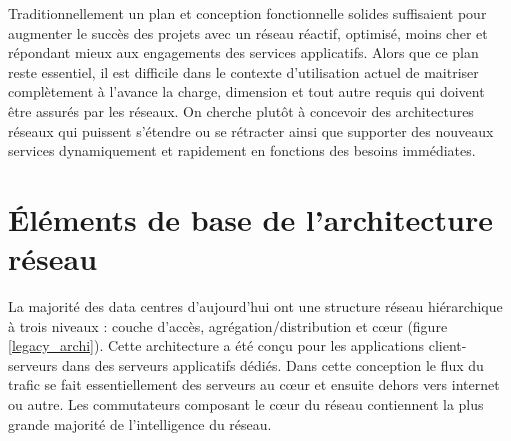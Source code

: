 Traditionnellement un plan et conception fonctionnelle solides suffisaient pour augmenter le succès des projets avec un réseau réactif, optimisé, moins cher et répondant mieux aux engagements des services applicatifs. Alors que ce plan reste essentiel, il est difficile dans le contexte d'utilisation actuel de maitriser complètement  à l'avance la charge, dimension et tout autre requis qui doivent être assurés par les réseaux. On cherche plutôt à concevoir des architectures réseaux qui puissent s'étendre ou se rétracter ainsi que supporter des nouveaux services dynamiquement et rapidement  en fonctions des besoins immédiates. \cite{ibmPlanningVirtCCchap4}


\section{Éléments de base de l'architecture réseau}

La majorité des data centres d'aujourd'hui ont une structure réseau hiérarchique à trois niveaux : couche d'accès, agrégation/distribution et cœur (figure \ref{legacy_archi}). Cette architecture a été conçu pour les applications client-serveurs dans des serveurs applicatifs dédiés. Dans cette conception le flux du trafic se fait essentiellement des serveurs au cœur et ensuite dehors vers internet ou autre. Les commutateurs composant le cœur du réseau contiennent la plus grande majorité de l'intelligence du réseau.


